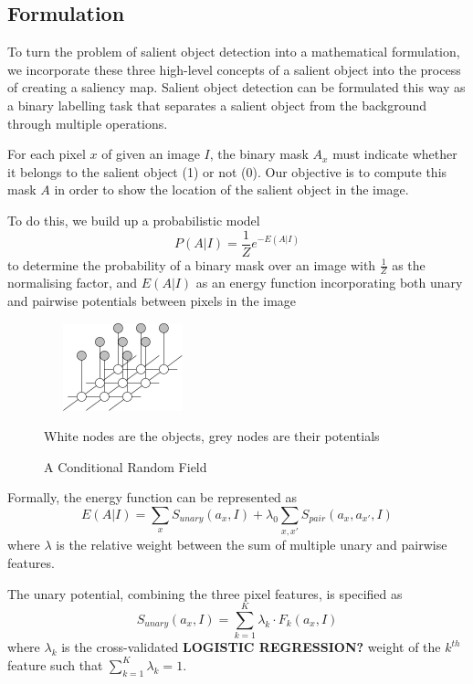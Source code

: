 \documentclass[10pt,twocolumn,letterpaper]{article}
\newcommand{\SUM}{\sum\limits}
\newcommand{\BOLD}{\textbf}
\begin{document}
\subsection{Formulation}

To turn the problem of salient object detection into a mathematical formulation, we incorporate these three high-level concepts of a salient object into the process of creating a saliency map.  Salient object detection can be formulated this way as a binary labelling task that separates a salient object from the background through multiple operations.

For each pixel $x$ of given an image $I$, the binary mask $A_x$ must indicate whether it belongs to the salient object (1) or not (0). Our objective is to compute this mask $A$ in order to show the location of the salient object in the image.

To do this, we build up a probabilistic model $$P(A|I)=\frac{1}{Z}e^{-E(A|I)}$$ to determine the probability of a binary mask over an image with $\frac{1}{Z}$ as the normalising factor, and $E(A|I)$ as an energy function incorporating both unary and pairwise potentials between pixels in the image

\begin{figure}[h]
    \begin{center}
        \includegraphics[width=1.8in,height=1in]{./Figures/mrf.jpg} \\
        \caption{A Conditional Random Field }\small White nodes are the objects, grey nodes are their potentials
        \end{center}
\end{figure}

Formally, the energy function can be represented as $$E(A|I) = \SUM_x S_{unary}(a_x,I) + \lambda_0 \SUM_{x,x'}S_{pair}(a_x,a_{x'},I)$$ where $\lambda$ is the relative weight between the sum of multiple unary  and pairwise features. 

The unary potential, combining the three pixel features, is specified as $$S_{unary}(a_x,I) = \SUM_{k=1}^K \lambda_k \cdot F_k(a_x,I)$$ where $\lambda_k$ is the cross-validated \BOLD{LOGISTIC REGRESSION?} weight of the $k^{th}$ feature such that $\sum_{k=1}^{K} \lambda_k = 1$.
\end{document}
